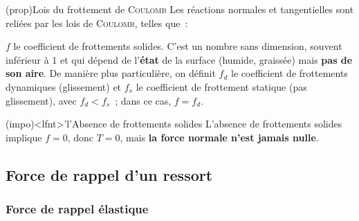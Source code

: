 \documentclass[../../main/main.tex]{subfiles}
\begin{document}
\begin{tcb*}(prop){Lois du frottement de \textsc{Coulomb}}
	Les réactions normales et tangentielles sont reliées par les lois de
	\textsc{Coulomb}, telles que~:
	\smallbreak
	\begin{isd}
		\psw{
			\[
				\norm{\Tf} = f\norm{\Nf}
				\qou
				\norm{\Tf} = f_d \norm{\Nf}
			\]
		}
		\tcblower
		\psw{
			\[
				\norm{\Tf} < f\norm{\Nf}
				\qou
				\norm{\Tf} = f_s \norm{\Nf}
			\]
		}
	\end{isd}
	$f$ le coefficient de frottements solides. C'est un nombre sans
	dimension, souvent inférieur à 1 et qui dépend de l'\textbf{état} de la
	surface (humide, graissée) mais \textbf{pas de son aire}.
	\bigbreak
	De manière plus particulière, on définit $f_d$ le coefficient de frottements
	dynamiques (glissement) et $f_s$ le coefficient de frottement statique (pas
	glissement), avec $f_d < f_s$~; dans ce cas, $f = f_d$.
\end{tcb*}

\begin{tcb*}(impo)<lfnt>'l'{Absence de frottements solides}
	L'absence de frottements solides implique $f=0$, donc $T = 0$, mais
	\textbf{la force normale n'est jamais nulle}.
\end{tcb*}

\subsection{Force de rappel d'un ressort}
\subsubsection{Force de rappel élastique}
\end{document}
